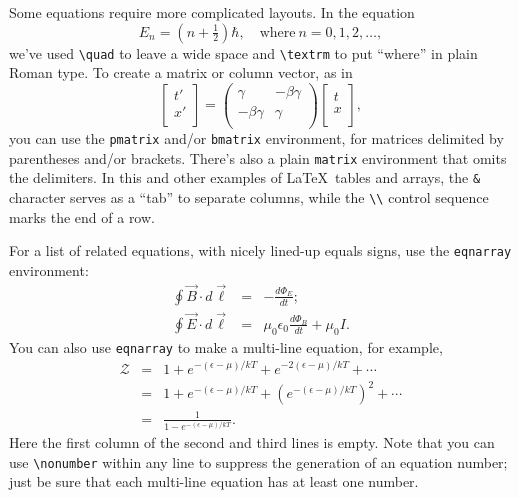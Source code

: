 \documentclass[prb,preprint]{revtex4-2}
\begin{document}
Some equations require more complicated layouts. In the equation
\begin{equation}
E_n = (n + \tfrac12)\hbar, \quad \textrm{where}\  n = 0, 1, 2, \ldots,
\end{equation}
we've used \verb/\quad/ to leave a wide space and \verb/\textrm/ to put ``where'' 
in plain Roman type.  To create a matrix or column vector, as in
\begin{equation}
\begin{bmatrix}
	t' \\
	x' \\
\end{bmatrix}
=
\begin{pmatrix}
	 \gamma & -\beta\gamma \\
	-\beta\gamma & \gamma \\
\end{pmatrix}
\begin{bmatrix}
	t \\
	x \\
\end{bmatrix},
\end{equation}
you can use the \texttt{pmatrix} and/or \texttt{bmatrix} environment, 
for matrices delimited by parentheses and/or brackets.  There's also
a plain \texttt{matrix} environment that omits the delimiters.
In this and other examples of \LaTeX\ tables and arrays, the \verb/&/ 
character serves as a ``tab'' to separate columns, while the \verb/\\/ 
control sequence marks the end of a row.

For a list of related equations, with nicely lined-up equals signs, 
use the \texttt{eqnarray} environment:
\begin{eqnarray}
\oint \vec B \cdot d\vec\ell & = & -\frac{d\Phi_E}{dt} ; \\
\oint \vec E \cdot d\vec\ell & = & \mu_0\epsilon_0\frac{d\Phi_B}{dt} + \mu_0 I.
\end{eqnarray}
You can also use \texttt{eqnarray} to make a multi-line equation, for example,
\begin{eqnarray}
\mathcal{Z} 
& = & 1 + e^{-(\epsilon-\mu)/kT} + e^{-2(\epsilon-\mu)/kT} + \cdots \nonumber \\
& = & 1 + e^{-(\epsilon-\mu)/kT} + (e^{-(\epsilon-\mu)/kT})^2 + \cdots \nonumber \\
& = & \frac{1}{1 - e^{-(\epsilon-\mu)/kT}}.
\end{eqnarray}
Here the first column of the second and third lines is empty.  Note that you 
can use \verb/\nonumber/ within any line to suppress the generation of
an equation number; just be sure that each multi-line equation has at least 
one number.
\end{document}

